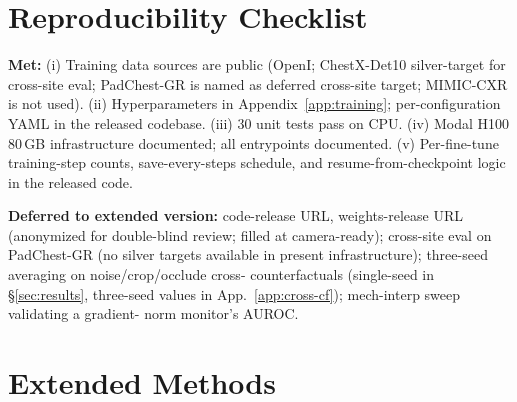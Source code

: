 \documentclass{article}
\begin{document}

\printAffiliationsAndNotice{}



\appendix
\onecolumn

\section{Reproducibility Checklist}
\label{app:repro}

\textbf{Met:} (i) Training data sources are public (OpenI; ChestX-Det10
silver-target for cross-site eval; PadChest-GR is named as deferred
cross-site target; MIMIC-CXR is not used). (ii) Hyperparameters in
Appendix~\ref{app:training}; per-configuration YAML in the released
codebase. (iii) $30$ unit tests pass on CPU. (iv) Modal H100 80\,GB
infrastructure documented; all entrypoints documented.
(v) Per-fine-tune training-step counts, save-every-steps schedule, and
resume-from-checkpoint logic in the released code.

\textbf{Deferred to extended version:} code-release URL, weights-release
URL (anonymized for double-blind review; filled at camera-ready);
cross-site eval on PadChest-GR (no silver targets available in present
infrastructure); three-seed averaging on noise/crop/occlude cross-
counterfactuals (single-seed in \S\ref{sec:results}, three-seed values
in App.~\ref{app:cross-cf}); mech-interp sweep validating a gradient-
norm monitor's AUROC.

\section{Extended Methods}
\label{app:methods}
\end{document}
